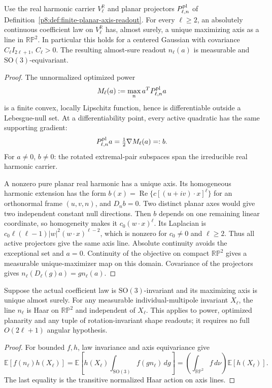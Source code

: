 \documentclass[12pt,a4paper]{article}
\begin{document}
\begin{theorem}
\label{p8:thm:v2189-sky-axis-unique}
Use the real harmonic carrier $V_\ell^{\mathbb R}$ and planar projectors
$P_{\ell,n}^{\rm pl}$ of Definition~\ref{p8:def:finite-planar-axis-readout}.
For every $\ell\ge2$, an absolutely continuous coefficient law on
$V_\ell^{\mathbb R}$ has, almost surely, a unique maximizing axis as a
line in $\mathbb{RP}^2$. In particular this holds for a centered Gaussian
with covariance $C_\ell I_{2\ell+1}$, $C_\ell>0$.
The resulting almost-sure readout $n_\ell(a)$ is measurable and
$\mathrm{SO}(3)$-equivariant.
\end{theorem}
\begin{proof}
The unnormalized optimized power
\[
 M_\ell(a):=\max_n a^TP_{\ell,n}^{\rm pl}a
\]
is a finite convex, locally Lipschitz function, hence is differentiable
outside a Lebesgue-null set. At a differentiability point, every active
quadratic has the same supporting gradient:
\[
 P_{\ell,n}^{\rm pl}a=\tfrac12\nabla M_\ell(a)=:b.
\]
For $a\ne0$, $b\ne0$: the rotated extremal-pair subspaces span the
irreducible real harmonic carrier.

A nonzero pure planar real harmonic has a unique axis. Its homogeneous
harmonic extension has the form
$b(x)=\operatorname{Re}\{c[(u+iv)\cdot x]^\ell\}$ for an orthonormal
frame $(u,v,n)$, and $D_nb=0$. Two distinct planar axes would give two
independent constant null directions. Then $b$ depends on one remaining
linear coordinate, so homogeneity makes it $c_0(w\cdot x)^\ell$.
Its Laplacian is
$c_0\ell(\ell-1)|w|^2(w\cdot x)^{\ell-2}$, which is nonzero for
$c_0\ne0$ and $\ell\ge2$. Thus all active projectors give the same
axis line. Absolute continuity avoids the exceptional set and $a=0$.
Continuity of the objective on compact $\mathbb{RP}^2$ gives a measurable
unique-maximizer map on this domain. Covariance of the projectors gives
$n_\ell(D_\ell(g)a)=g n_\ell(a)$.
\end{proof}

\begin{corollary}
\label{p8:cor:v2189-sky-haar-shape}
Suppose the actual coefficient law is $\mathrm{SO}(3)$-invariant and
its maximizing axis is unique almost surely. For any measurable
individual-multipole invariant $X_\ell$, the line $n_\ell$ is Haar on
$\mathbb{RP}^2$ and independent of $X_\ell$. This applies to power,
optimized planarity and any tuple of rotation-invariant shape readouts;
it requires no full $O(2\ell+1)$ angular hypothesis.
\end{corollary}
\begin{proof}
For bounded $f,h$, law invariance and axis equivariance give
\[
 \mathbb E[f(n_\ell)h(X_\ell)]
 =\mathbb E\!\left[h(X_\ell)
       \int_{\mathrm{SO}(3)}f(g n_\ell)\,dg\right]
 =\left(\int_{\mathbb{RP}^2}f\,d\nu\right)\mathbb E[h(X_\ell)].
\]
The last equality is the transitive normalized Haar action on axis lines.
\end{proof}
\end{document}
